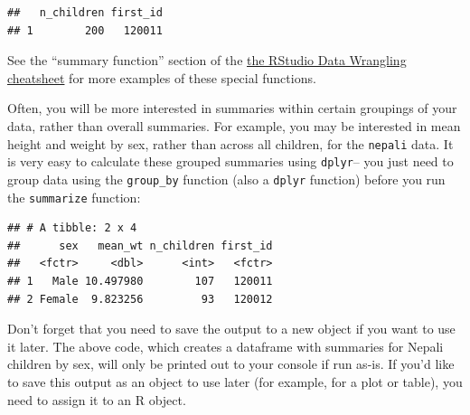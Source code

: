 \documentclass[]{book}
\makeatletter
\newenvironment{Shaded}{\begin{snugshade}}{\end{snugshade}}
\newcommand{\KeywordTok}[1]{\textcolor[rgb]{0.13,0.29,0.53}{\textbf{#1}}}
\newcommand{\DataTypeTok}[1]{\textcolor[rgb]{0.13,0.29,0.53}{#1}}
\newcommand{\StringTok}[1]{\textcolor[rgb]{0.31,0.60,0.02}{#1}}
\newcommand{\OtherTok}[1]{\textcolor[rgb]{0.56,0.35,0.01}{#1}}
\newcommand{\OperatorTok}[1]{\textcolor[rgb]{0.81,0.36,0.00}{\textbf{#1}}}
\newcommand{\NormalTok}[1]{#1}
\newenvironment{kframe}{%
\medskip{}
\setlength{\fboxsep}{.8em}
 \def\at@end@of@kframe{}%
 \ifinner\ifhmode%
  \def\at@end@of@kframe{\end{minipage}}%
  \begin{minipage}{\columnwidth}%
 \fi\fi%
 \def\FrameCommand##1{\hskip\@totalleftmargin \hskip-\fboxsep
 \colorbox{shadecolor}{##1}\hskip-\fboxsep
     \hskip-\linewidth \hskip-\@totalleftmargin \hskip\columnwidth}%
 \MakeFramed {\advance\hsize-\width
   \@totalleftmargin\z@ \linewidth\hsize
   \@setminipage}}%
 {\par\unskip\endMakeFramed%
 \at@end@of@kframe}
\renewenvironment{Shaded}{\begin{kframe}}{\end{kframe}}
\newenvironment{rmdblock}[1]
  {
  \begin{itemize}
  \renewcommand{\labelitemi}{
    \raisebox{-.7\height}[0pt][0pt]{
      {\setkeys{Gin}{width=3em,keepaspectratio}\texttt{[image: images/\#1]}}
    }
  }
  \setlength{\fboxsep}{1em}
  \begin{kframe}
  \item
  }
  {
  \end{kframe}
  \end{itemize}
  }
\newenvironment{rmdnote}
  {\begin{rmdblock}{note}}
  {\end{rmdblock}}
\theoremstyle{definition}
\theoremstyle{definition}
\theoremstyle{definition}
\theoremstyle{remark}
\makeatother
\begin{document}
\begin{Shaded}
\end{Shaded}

\begin{verbatim}
##   n_children first_id
## 1        200   120011
\end{verbatim}

See the ``summary function'' section of the
\href{https://www.rstudio.com/wp-content/uploads/2015/02/data-wrangling-cheatsheet.pdf}{the
RStudio Data Wrangling cheatsheet} for more examples of these special
functions.

Often, you will be more interested in summaries within certain groupings
of your data, rather than overall summaries. For example, you may be
interested in mean height and weight by sex, rather than across all
children, for the \texttt{nepali} data. It is very easy to calculate
these grouped summaries using \texttt{dplyr}-- you just need to group
data using the \texttt{group\_by} function (also a \texttt{dplyr}
function) before you run the \texttt{summarize} function:

\begin{Shaded}
\end{Shaded}

\begin{verbatim}
## # A tibble: 2 x 4
##      sex   mean_wt n_children first_id
##   <fctr>     <dbl>      <int>   <fctr>
## 1   Male 10.497980        107   120011
## 2 Female  9.823256         93   120012
\end{verbatim}

\begin{rmdnote}
Don't forget that you need to save the output to a new object if you
want to use it later. The above code, which creates a dataframe with
summaries for Nepali children by sex, will only be printed out to your
console if run as-is. If you'd like to save this output as an object to
use later (for example, for a plot or table), you need to assign it to
an R object.
\end{rmdnote}
\end{document}
